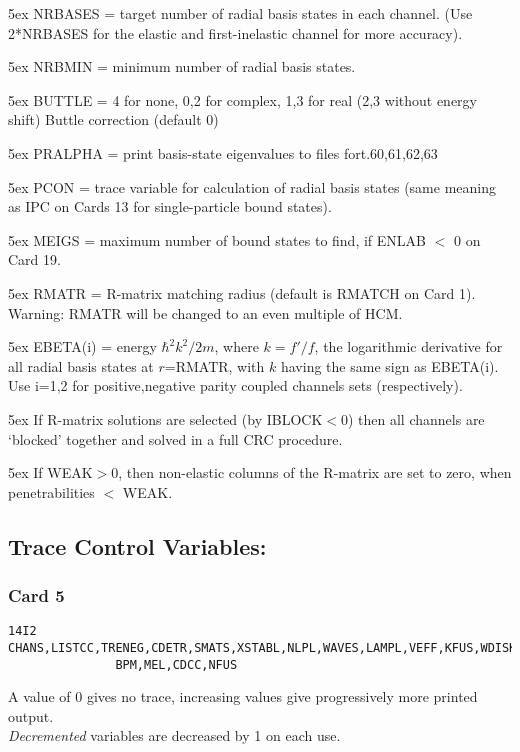 \documentclass[11pt]{article}
\begin{document}
\hangindent 5ex
NRBASES = target number of radial basis states in each channel.
(Use 2*NRBASES for the elastic and first-inelastic channel for more accuracy).

\hangindent 5ex
NRBMIN = minimum number of radial basis states.

\hangindent 5ex
BUTTLE = 4 for none, 0,2 for complex, 1,3 for real
(2,3 without energy shift) Buttle correction (default 0)

\hangindent 5ex
PRALPHA = print basis-state eigenvalues to files fort.60,61,62,63

\hangindent 5ex
PCON = trace variable for calculation of radial basis states (same
meaning as IPC on Cards 13 for single-particle bound states).

\hangindent 5ex
MEIGS = maximum number of bound states to find, if ENLAB $<$ 0 on Card 19.

\hangindent 5ex
RMATR = R-matrix matching radius (default is RMATCH on Card 1).
Warning: RMATR will be changed to an even multiple of HCM.

\hangindent 5ex
EBETA(i) = energy $\hbar^2k^2/2m$, where $k= f'/f$, the logarithmic derivative
for all radial basis states at $r$=RMATR, with $k$ having the same
sign as EBETA(i). Use i=1,2 for positive,negative parity coupled channels
sets (respectively).

\hangindent 5ex
If R-matrix solutions are selected (by IBLOCK$<$0) then all channels
are `blocked' together and solved in a full CRC procedure.

\hangindent 5ex
If WEAK$>$0, then non-elastic columns of the R-matrix are set to zero,
  when penetrabilities $<$ WEAK.


\subsection{Trace Control Variables:}
%
\subsubsection*{Card 5}
\begin{verbatim}
14I2
CHANS,LISTCC,TRENEG,CDETR,SMATS,XSTABL,NLPL,WAVES,LAMPL,VEFF,KFUS,WDISK,
               BPM,MEL,CDCC,NFUS
\end{verbatim}
A value of 0 gives no trace,
increasing values give progressively more printed output.
\\
{\em Decremented} variables are decreased by 1 on each use.
\end{document}
